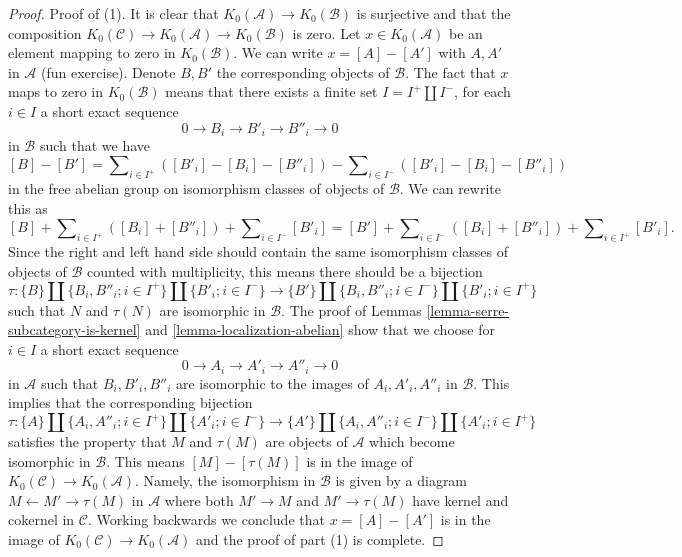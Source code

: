 \begin{proof}
Proof of (1). It is clear that $K_0(\mathcal{A}) \to K_0(\mathcal{B})$
is surjective and that the composition $K_0(\mathcal{C}) \to
K_0(\mathcal{A}) \to K_0(\mathcal{B})$ is zero. Let $x \in K_0(\mathcal{A})$
be an element mapping to zero in $K_0(\mathcal{B})$. We can write
$x = [A] - [A']$ with $A, A'$ in $\mathcal{A}$ (fun exercise).
Denote $B, B'$ the corresponding objects of $\mathcal{B}$. The fact that
$x$ maps to zero in $K_0(\mathcal{B})$
means that there exists a finite set $I = I^+ \amalg I^{-}$,
for each $i \in I$ a short exact sequence
$$
0 \to B_i \to B'_i \to B''_i \to 0
$$
in $\mathcal{B}$ such that we have
$$
[B] - [B'] = \sum\nolimits_{i \in I^{+}} ([B'_i] - [B_i] - [B''_i])
-
\sum\nolimits_{i \in I^{-}} ([B'_i] - [B_i] - [B''_i])
$$
in the free abelian group on isomorphism classes of objects of $\mathcal{B}$.
We can rewrite this as
$$
[B]
+ \sum\nolimits_{i \in I^{+}} ([B_i] + [B''_i])
+ \sum\nolimits_{i \in I^{-}} [B'_i]
=
[B']
+ \sum\nolimits_{i \in I^{-}} ([B_i] + [B''_i])
+ \sum\nolimits_{i \in I^{+}} [B'_i].
$$
Since the right and left hand side should contain the same isomorphism classes
of objects of $\mathcal{B}$ counted with multiplicity, this means there should
be a bijection
$$
\tau :
\{B\} \amalg \{B_i, B''_i; i \in I^+\} \amalg \{B'_i; i \in I^-\}
\longrightarrow
\{B'\} \amalg \{B_i, B''_i; i \in I^-\} \amalg \{B'_i; i \in I^+\}
$$
such that $N$ and $\tau(N)$ are isomorphic in $\mathcal{B}$.
The proof of Lemmas \ref{lemma-serre-subcategory-is-kernel} and
\ref{lemma-localization-abelian} show that we choose for $i \in I$
a short exact sequence
$$
0 \to A_i \to A'_i \to A''_i \to 0
$$
in $\mathcal{A}$ such that $B_i, B'_i, B''_i$ are isomorphic to the
images of $A_i, A'_i, A''_i$ in $\mathcal{B}$. This implies that the
corresponding bijection
$$
\tau :
\{A\} \amalg \{A_i, A''_i; i \in I^+\} \amalg \{A'_i; i \in I^-\}
\longrightarrow
\{A'\} \amalg \{A_i, A''_i; i \in I^-\} \amalg \{A'_i; i \in I^+\}
$$
satisfies the property that $M$ and $\tau(M)$ are objects of $\mathcal{A}$
which become isomorphic in $\mathcal{B}$. This means $[M] - [\tau(M)]$
is in the image of $K_0(\mathcal{C}) \to K_0(\mathcal{A})$. Namely,
the isomorphism in $\mathcal{B}$ is given by a diagram
$M \leftarrow M' \rightarrow \tau(M)$ in $\mathcal{A}$ where both
$M' \to M$ and $M' \to \tau(M)$ have kernel and cokernel in $\mathcal{C}$.
Working backwards we conclude that $x = [A] - [A']$ is in the image
of $K_0(\mathcal{C}) \to K_0(\mathcal{A})$ and the proof of part (1)
is complete.


\end{proof}
